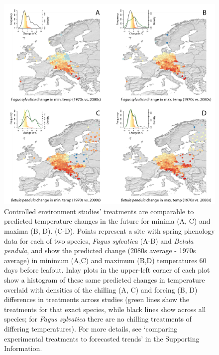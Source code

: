 \documentclass[11pt,letter]{article}
\begin{document}
\begin{figure}[t!]
\centering
\includegraphics[width=1\textwidth]{figures/Fig7_noblues_densities.png}
\caption{Controlled environment studies' treatments are comparable to predicted temperature changes in the future for minima (A, C) and maxima (B, D). (C-D). Points represent a site with spring phenology data for each of two species, \emph{Fagus sylvatica} (A-B) and \emph{Betula pendula}, \citep[from the PEP725 database,][]{Templ2018} and show the predicted change (2080s average - 1970s average) in minimum (A,C) and maximum (B,D) temperatures 60 days before leafout. Inlay plots in the upper-left  corner of each plot show a histogram of these same predicted changes in temperature overlaid with densities of the chilling (A, C) and forcing (B, D) differences in treatments across studies (green lines show the treatments for that exact species, while black lines show across all species; for \emph{Fagus sylvatica} there are no chilling treatments of differing temperatures). For more details, see `comparing experimental treatments to forecasted trends' in the Supporting Information.}
  \label{fig:pep} %
\end{figure}
\end{document}
